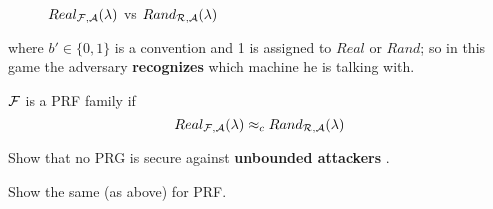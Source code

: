 \begin{figure}[!ht]
   \sdinit{}
   \sdinit{}
   \caption{$Real_{\mathcal{F}, \mathcal{A}}(\lambda)$ vs $Rand_{\mathcal{R}, \mathcal{A}}(\lambda) $}
\end{figure}

where $b' \in \{0,1\}$ is a convention and 1 is assigned to $Real$ or $Rand$; so
in this game the adversary \textbf{recognizes}  which machine he is talking with.

\begin{definition}
    $\mathcal{F}$ is a PRF family if 
    \[
        Real_{\mathcal{F}, \mathcal{A}}(\lambda) \approx_{c} Rand_{\mathcal{R}, \mathcal{A}}(\lambda)
    \]
\end{definition}

\begin{exercise}
    Show that no PRG is secure against \textbf{unbounded attackers} .
\end{exercise}

\begin{exercise}
    Show the same (as above) for PRF.
\end{exercise}

